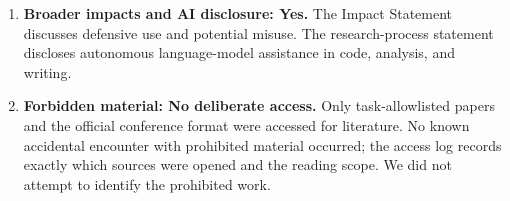 \documentclass{article}
\begin{document}
\begin{enumerate}
\item \textbf{Broader impacts and AI disclosure: Yes.} The Impact Statement discusses defensive use and potential misuse. The research-process statement discloses autonomous language-model assistance in code, analysis, and writing.
\item \textbf{Forbidden material: No deliberate access.} Only task-allowlisted papers and the official conference format were accessed for literature. No known accidental encounter with prohibited material occurred; the access log records exactly which sources were opened and the reading scope. We did not attempt to identify the prohibited work.
\end{enumerate}
\end{document}
